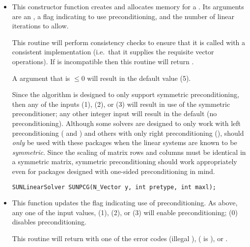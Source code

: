 \begin{itemize}


\item {}

  This constructor function creates and allocates memory for a {\pcg}
  .  Its arguments are an {\nvector}, a flag
  indicating to use preconditioning, and the number of linear
  iterations to allow. 

  This routine will perform consistency checks to ensure that it is
  called with a consistent {\nvector} implementation (i.e.~that it
  supplies the requisite vector operations).  If  is
  incompatible then this routine will return .

  A  argument that is $\le0$ will result in the default
  value (5).

  Since the {\pcg} algorithm is designed to only support symmetric
  preconditioning, then any of the  inputs 
  (1),  (2), or  (3) will result in use
  of the symmetric preconditioner;  any other integer input will
  result in the default (no preconditioning).
  Although some {\sundials} solvers are designed to only work
  with left preconditioning ({\ida} and {\idas}) and others with only
  right preconditioning ({\kinsol}), {\pcg} should \emph{only} be used
  with these packages when the linear systems are known to
  be \emph{symmetric}.  Since the scaling of matrix rows and columns
  must be identical in a symmetric matrix, symmetric preconditioning
  should work appropriately even for packages designed with one-sided
  preconditioning in mind.

  \verb|SUNLinearSolver SUNPCG(N_Vector y, int pretype, int maxl);|


\item {}

  This function updates the flag indicating use of preconditioning.
  As above, any one of the input values,  (1),
   (2), or  (3) will enable
  preconditioning;  (0) disables preconditioning.

  This routine will return with one of the error codes
   (illegal ), 
  ( is ), or .
  

\end{itemize}

